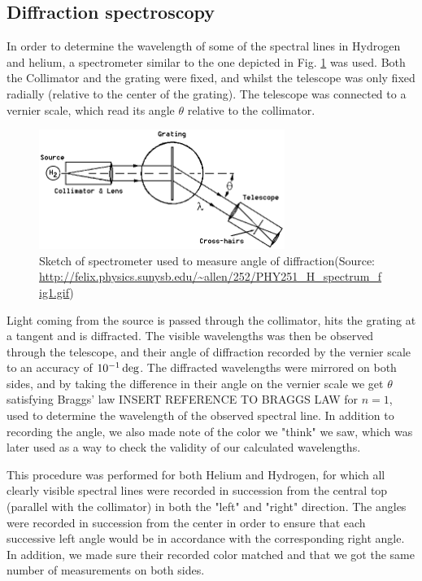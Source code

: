 \documentclass[11pt,a4paper]{article}
\begin{document}
    \subsection{Diffraction spectroscopy}

    In order to determine the wavelength of some of the spectral lines in Hydrogen and helium, a spectrometer similar to the one depicted in Fig. \ref{fig:spectrometer} was used. Both the Collimator and the grating were fixed, and whilst the telescope was only fixed radially (relative to the center of the grating). The telescope was connected to a vernier scale, which read its angle $\theta$ relative to the collimator.

    \begin{figure}[H]
        \center
        \includegraphics[width=8cm]{scripts/figs/PHY251_H_spectrum_fig1.png}
        \caption{Sketch of spectrometer used to measure angle of diffraction(Source: \url{http://felix.physics.sunysb.edu/~allen/252/PHY251_H_spectrum_fig1.gif})}
        \label{fig:spectrometer}
    \end{figure}

    Light coming from the source is passed through the collimator, hits the grating at a tangent and is diffracted. The visible wavelengths was then be observed through the telescope, and their angle of diffraction recorded by the vernier scale to an accuracy of $10^{-1}\,\textup{deg}$. The diffracted wavelengths were mirrored on both sides, and by taking the difference in their angle on the vernier scale we get $\theta$ satisfying Braggs' law INSERT REFERENCE TO BRAGGS LAW for $n=1$, used to determine the wavelength of the observed spectral line. In addition to recording the angle, we also made note of the color we "think" we saw, which was later used as a way to check the validity of our calculated wavelengths.

    This procedure was performed for both Helium and Hydrogen, for which all clearly visible spectral lines were recorded in succession from the central top (parallel with the collimator) in both the "left" and "right" direction. The angles were recorded in succession from the center in order to ensure that each successive left angle would be in accordance with the corresponding right angle. In addition, we made sure their recorded color matched and that we got the same number of measurements on both sides.
\end{document}
